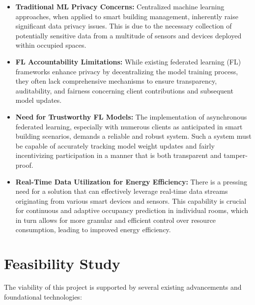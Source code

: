 \begin{itemize}
    \item \textbf{Traditional ML Privacy Concerns:} Centralized machine learning approaches, when applied to smart building management, inherently raise significant data privacy issues.
This is due to the necessary collection of potentially sensitive data from a multitude of sensors and devices deployed within occupied spaces.
    \item \textbf{FL Accountability Limitations:} While existing federated learning (FL) frameworks enhance privacy by decentralizing the model training process, they often lack comprehensive mechanisms to ensure transparency, auditability, and fairness concerning client contributions and subsequent model updates.
    \item \textbf{Need for Trustworthy FL Models:} The implementation of asynchronous federated learning, especially with numerous clients as anticipated in smart building scenarios, demands a reliable and robust system.
Such a system must be capable of accurately tracking model weight updates and fairly incentivizing participation in a manner that is both transparent and tamper-proof.
    \item \textbf{Real-Time Data Utilization for Energy Efficiency:} There is a pressing need for a solution that can effectively leverage real-time data streams originating from various smart devices and sensors.
This capability is crucial for continuous and adaptive occupancy prediction in individual rooms, which in turn allows for more granular and efficient control over resource consumption, leading to improved energy efficiency.
\end{itemize}


\section{Feasibility Study}
\label{sec:feasibility_study}

The viability of this project is supported by several existing advancements and foundational technologies:

